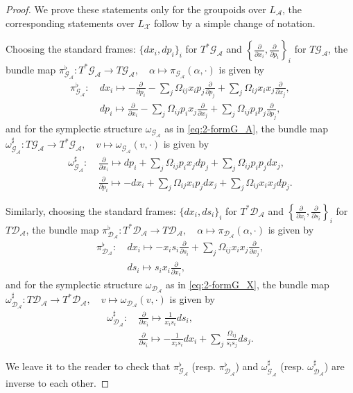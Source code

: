 \documentclass{amsart}
\numberwithin{equation}{section}
\newcommand{\cA}{\mathcal{A}}
\newcommand{\cG}{\mathcal{G}}
\renewcommand{\cD}{\mathcal{D}}
\newcommand{\cX}{\mathcal{X}}
\begin{document}
\begin{proof}
  We prove these statements only for the groupoids over $L_\cA$, the corresponding statements over $L_\cX$ follow by a simple change of notation.

  Choosing the standard frames: $\{dx_i, dp_i\}_i$ for $T^*\cG_\cA$ and $\left\{\frac{\partial}{\partial x_i}, \frac{\partial}{\partial p_i}\right\}_i$ for $T\cG_\cA$, the bundle map $\pi_{\cG_\cA}^\flat: T^*\cG_\cA \to T\cG_\cA, \quad \alpha \mapsto \pi_{\cG_\cA}(\alpha, \cdot)$ is given by
  \begin{align*}
    \pi_{\cG_\cA}^\flat: &~ dx_i \mapsto -\frac{\partial}{\partial p_i} - \sum_{j} \Omega_{ij} x_i p_j \frac{\partial}{\partial p_j}+ \sum_{j} \Omega_{ij} x_i x_j \frac{\partial}{\partial x_j}, \\
    &~ dp_i \mapsto \frac{\partial}{\partial x_i} - \sum_{j} \Omega_{ij} p_i x_j \frac{\partial}{\partial x_j}+ \sum_{j} \Omega_{ij} p_i p_j \frac{\partial}{\partial p_j},
  \end{align*}
  and for the symplectic structure $\omega_{\cG_\cA}$ as in \eqref{eq:2-formG_A}, the bundle map $\omega_{\cG_\cA}^\sharp: T\cG_\cA \to T^*\cG_\cA, \quad v \mapsto \omega_{\cG_\cA}(v, \cdot)$ is given by
  \begin{align*}
    \omega_{\cG_\cA}^\sharp: &~ \frac{\partial}{\partial x_i} \mapsto dp_i + \sum_{j} \Omega_{ij} p_i x_j dp_j + \sum_{j} \Omega_{ij} p_i p_j dx_j, \\
    &~ \frac{\partial}{\partial p_i} \mapsto -dx_i + \sum_{j} \Omega_{ij} x_i p_j dx_j + \sum_{j} \Omega_{ij} x_i x_j dp_j.
  \end{align*}

  Similarly, choosing the standard frames: $\{dx_i, ds_i\}_i$ for $T^*\cD_\cA$ and $\left\{\frac{\partial}{\partial x_i}, \frac{\partial}{\partial s_i}\right\}_i$ for $T\cD_\cA$, the bundle map $\pi_{\cD_\cA}^\flat: T^*\cD_\cA \to T\cD_\cA, \quad \alpha \mapsto \pi_{\cD_\cA}(\alpha, \cdot)$ is given by
  \begin{align*}
    \pi_{\cD_\cA}^\flat: &~ dx_i \mapsto -x_i s_i \frac{\partial}{\partial s_i} + \sum_{j} \Omega_{ij} x_i x_j \frac{\partial}{\partial x_j}, \\
    &~ ds_i \mapsto s_i x_i \frac{\partial}{\partial x_i},
  \end{align*}
  and for the symplectic structure $\omega_{\cD_\cA}$ as in \eqref{eq:2-formG_X}, the bundle map $\omega_{\cD_\cA}^\sharp: T\cD_\cA \to T^*\cD_\cA, \quad v \mapsto \omega_{\cD_\cA}(v, \cdot)$ is given by
  \begin{align*}
    \omega_{\cD_\cA}^\sharp: &~ \frac{\partial}{\partial x_i} \mapsto \frac{1}{x_i s_i} ds_i, \\
    &~ \frac{\partial}{\partial s_i} \mapsto -\frac{1}{x_i s_i} dx_i + \sum_{j} \frac{\Omega_{ij}}{s_i s_j} ds_j.
  \end{align*}

  We leave it to the reader to check that $\pi_{\cG_\cA}^\flat$ (resp. $\pi_{\cD_\cA}^\flat$) and $\omega_{\cG_\cA}^\sharp$ (resp. $\omega_{\cD_\cA}^\sharp$) are inverse to each other.
\end{proof}
\end{document}
